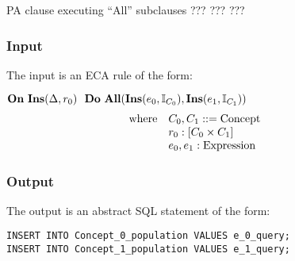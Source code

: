 \documentclass[12pt]{report}
\begin{document}





{PA clause executing ``All'' subclauses}  %
{???}  
{???}
{???}
\vspace{-12pt}\subsubsection*{Input}
The input is an ECA rule of the form:

$\mathbf{On~} \mathbf{Ins}(\Delta,r_0) \,\,\,\,\mathbf{Do~} \mathbf{All} ( \mathbf{Ins}(e_0,\mathbb{I}_{C_0}), \mathbf{Ins}(e_1,\mathbb{I}_{C_1}) )$
\vspace{-10pt}\[\hspace{-20pt}\begin{array}{ll}
\text{where} & C_0, C_1 ::= \text{Concept} \\ 
             & r_0 : [ C_0 \times C_1 ] \\ 
             & e_0, e_1 : \text{Expression} \\ 
\end{array}\]

\vspace{-12pt}\subsubsection*{Output}

The output is an abstract SQL statement of the form:
\begin{verbatim}
INSERT INTO Concept_0_population VALUES e_0_query;
INSERT INTO Concept_1_population VALUES e_1_query;
\end{verbatim}
\end{document}

